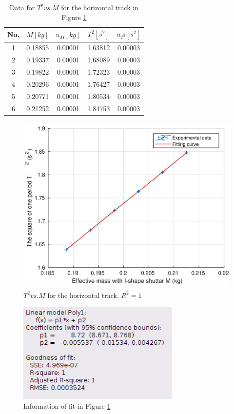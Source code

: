     \begin{table}[h] \small
        \centering
        \begin{tabular}{|c|c|c|c|c|}
            \hline
            No. & $M[kg]$ & $u_{M}[kg]$ & $T^2[s^2]$ & $u_{T^2}[s^2]$\\ \hline
            1 & 0.18855 & 0.00001 & 1.63812 & 0.00003\\ \hline
            2 & 0.19337 & 0.00001 & 1.68089 & 0.00003\\ \hline
            3 & 0.19822 & 0.00001 & 1.72323 & 0.00003\\ \hline
            4 & 0.20296 & 0.00001 & 1.76427 & 0.00003\\ \hline
            5 & 0.20771 & 0.00001 & 1.80534 & 0.00003\\ \hline
            6 & 0.21252 & 0.00001 & 1.84753 & 0.00003\\ \hline
        \end{tabular}
        \caption{Data for $T^2 vs. M$ for the horizontal track in Figure \ref{tm}}\label{tmdata}
    \end{table}
    \begin{figure}[!h]
        \centering    
        \includegraphics[height=9cm]{images/tm.eps}
        \caption{$T^2 vs. M$ for the horizontal track. $R^2=1$}\label{tm}
    \end{figure}
    \begin{figure}[!h]
        \centering
        \includegraphics[height=5cm]{images/tminfo.png}
        \caption{Information of fit in Figure \ref{tm}}\label{tminfo}
    \end{figure}
